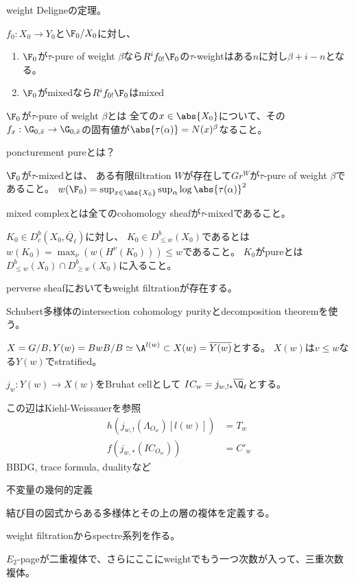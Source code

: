 \documentclass[dvipdfmx]{beamer}
\begin{document}
\begin{frame}{weight}
Deligneの定理。
\begin{thm}[Deligne]
$f_0:X_0\to Y_0$と$\F_0/X_0$に対し、
\begin{enumerate}
\item $\F_0$が$\tau$-pure of weight $\beta$なら$R^if_{0!}\F_0$の$\tau$-weightはある$n$に対し$\beta+i-n$となる。
\item $\F_0$がmixedなら$R^if_{0!}\F_0$はmixed
\end{enumerate}

$\F_0$が$\tau$-pure of weight $\beta$とは
全ての$x\in\abs{X_0}$について、その$f_x:\G_{0,\bar{x}}\to \G_{0,\bar{x}}$の固有値が$\abs{\tau(\alpha)}=N(x)^\beta$なること。

poncturement pureとは？

$\F_0$が$\tau$-mixedとは、
ある有限filtration $W$が存在して$Gr^W$が$\tau$-pure of weight $\beta$であること。
$w(\F_0)=\sup_{x\in\abs{X_0}}\sup_\alpha\log\abs{\tau(\alpha)}^2$

mixed complexとは全てのcohomology sheafが$\tau$-mixedであること。

$K_0\in D^b_c(X_0,\overline{Q}_\ell)$に対し、
$K_0\in D^b_{\leq w}(X_0)$であるとは$w(K_0)=\max_\nu(w(H^\nu(K_0)))\leq w$であること。
$K_0$がpureとは$D^b_{\leq w}(X_0)\cap D^b_{\geq w}(X_0)$に入ること。

perverse sheafにおいてもweight filtrationが存在する。
\end{thm}

\end{frame}

\begin{frame}{Schubert多様体のintersection cohomology}
purityとdecomposition theoremを使う。

$X=G/B, Y(w)=BwB/B\simeq \A^{l(w)}\subset X(w)=\overline{Y(w)}$とする。
$X(w)$は$v\leq w$なる$Y(w)$でstratified。

$j_w:Y(w) \to X(w)$をBruhat cellとして
$IC_w=j_{w,!*}\overline{\Q}_\ell$とする。

この辺はKiehl-Weissauerを参照
\begin{align*}
h(j_{w,!}(\Lambda_{O_w})[l(w)])&=T_w\\
f(j_{w,*}(IC_{O_w}))&=C'_w
\end{align*}
BBDG, trace formula, dualityなど
\end{frame}

\begin{frame}
不変量の幾何的定義

結び目の図式からある多様体とその上の層の複体を定義する。

weight filtrationからspectre系列を作る。

$E_2$-pageが二重複体で、さらにここにweightでもう一つ次数が入って、三重次数複体。
\end{frame}
\end{document}
